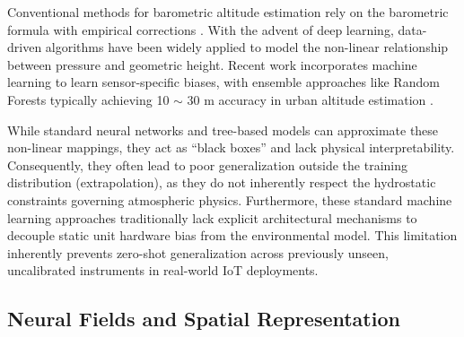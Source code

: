 
Conventional methods for barometric altitude estimation rely on the barometric formula with empirical corrections \cite{icao1993manual}. With the advent of deep learning, data-driven algorithms have been widely applied to model the non-linear relationship between pressure and geometric height. Recent work incorporates machine learning to learn sensor-specific biases, with ensemble approaches like Random Forests typically achieving 10 $\sim$ 30 m accuracy in urban altitude estimation \cite{zhang2020urban}. 

While standard neural networks and tree-based models can approximate these non-linear mappings, they act as ``black boxes'' and lack physical interpretability. Consequently, they often lead to poor generalization outside the training distribution (extrapolation), as they do not inherently respect the hydrostatic constraints governing atmospheric physics. Furthermore, these standard machine learning approaches traditionally lack explicit architectural mechanisms to decouple static unit hardware bias from the environmental model. This limitation inherently prevents zero-shot generalization across previously unseen, uncalibrated instruments in real-world IoT deployments.

\subsection{Neural Fields and Spatial Representation}

